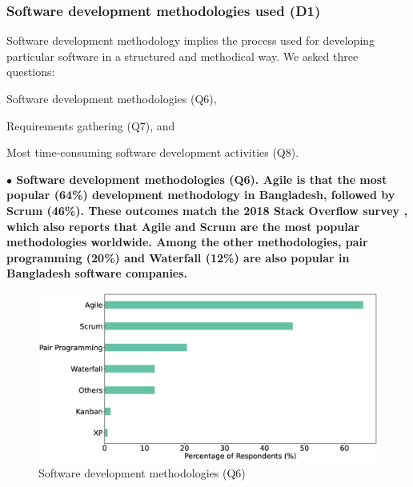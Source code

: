 \subsubsection{Software development methodologies used (D1)}
\label{methodology}

Software development methodology implies the process used for developing
particular software in a structured and methodical
way. We asked three questions: \begin{inparaenum}
\item Software development methodologies (Q6),
\item Requirements gathering (Q7), and
\item Most time-consuming software development activities (Q8).
\end{inparaenum}

\nd\bf{$\bullet$ Software development methodologies (Q6).} Agile is 
that the most popular (64\%) development methodology in Bangladesh, followed by Scrum (46\%). These outcomes match the 2018 Stack Overflow
survey \citep{StackoverflowSurvey2018}, which also reports that Agile and Scrum
are the most popular methodologies worldwide. Among the other methodologies, 
pair programming (20\%) and Waterfall (12\%) are also popular in Bangladesh software companies.
\begin{figure}[h]
\centering
  \includegraphics[scale=0.18]{Figures/Respondents_Methodology}
  \caption{Software development methodologies (Q6)}
  \label{fig:methodologies}
\end{figure}

